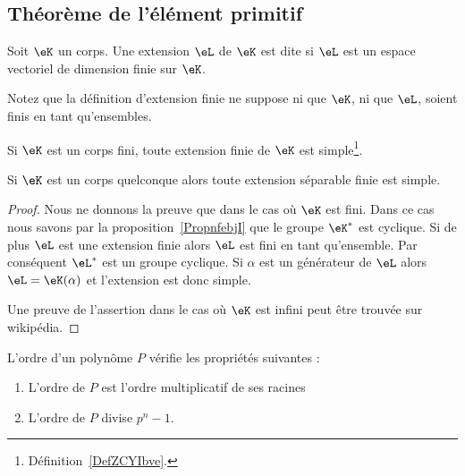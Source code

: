 \subsection{Théorème de l'élément primitif}

\begin{definition}
	Soit \( \eK\) un corps. Une extension \( \eL\) de \( \eK\) est dite  si \( \eL\) est un espace vectoriel de dimension finie sur \( \eK\).
\end{definition}
Notez que la définition d'extension finie ne suppose ni que \( \eK\), ni que \( \eL\), soient finis en tant qu'ensembles.

\begin{theorem}
	Si \( \eK\) est un corps fini, toute extension finie de \( \eK\) est simple\footnote{Définition~\ref{DefZCYIbve}.}.

	Si \( \eK\) est un corps quelconque alors toute extension séparable finie est simple.
\end{theorem}

\begin{proof}
	Nous ne donnons la preuve que dans le cas où \( \eK\) est fini. Dans ce cas nous savons par la proposition~\ref{PropnfebjI} que le groupe \( \eK^*\) est cyclique. Si de plus \( \eL\) est une extension finie alors \( \eL\) est fini en tant qu'ensemble. Par conséquent \( \eL^*\) est un groupe cyclique. Si \( \alpha\) est un générateur de \( \eL\) alors \( \eL=\eK(\alpha)\) et l'extension est donc simple.

	Une preuve de l'assertion dans le cas où \( \eK\) est infini peut être trouvée sur wikipédia.
\end{proof}

\begin{proposition}
	L'ordre d'un polynôme \( P\) vérifie les propriétés suivantes :
	\begin{enumerate}
		\item
		      L'ordre de \( P\) est l'ordre multiplicatif de ses racines
		\item
		      L'ordre de \( P\) divise \( p^n-1\).
	\end{enumerate}
\end{proposition}

